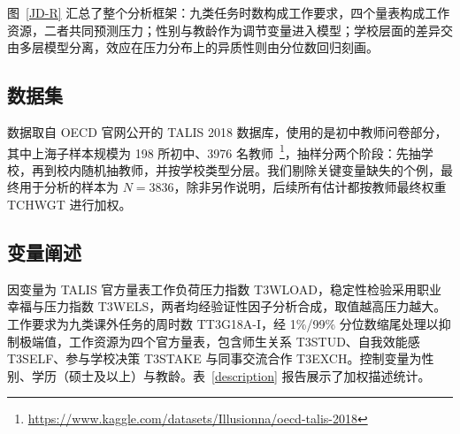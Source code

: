 \documentclass[zihao = -4, linespread = 1.5]{article}
\begin{document}
图~\ref{JD-R} 汇总了整个分析框架：九类任务时数构成工作要求，四个量表构成工作资源，二者共同预测压力；性别与教龄作为调节变量进入模型；学校层面的差异交由多层模型分离，效应在压力分布上的异质性则由分位数回归刻画。



\subsection{数据集}
数据取自 OECD 官网公开的 TALIS 2018 数据库，使用的是初中教师问卷部分，其中上海子样本规模为 198 所初中、3976 名教师~\footnote{\href{https://www.kaggle.com/datasets/illusionna/oecd-talis-2018}{https://www.kaggle.com/datasets/Illusionna/oecd-talis-2018}}，抽样分两个阶段：先抽学校，再到校内随机抽教师，并按学校类型分层。我们剔除关键变量缺失的个例，最终用于分析的样本为 $N=3836$，除非另作说明，后续所有估计都按教师最终权重 TCHWGT 进行加权。



\subsection{变量阐述}
因变量为 TALIS 官方量表工作负荷压力指数 T3WLOAD，稳定性检验采用职业幸福与压力指数 T3WELS，两者均经验证性因子分析合成，取值越高压力越大。工作要求为九类课外任务的周时数 TT3G18A-I，经 1\%/99\% 分位数缩尾处理以抑制极端值，工作资源为四个官方量表，包含师生关系 T3STUD、自我效能感 T3SELF、参与学校决策 T3STAKE 与同事交流合作 T3EXCH。控制变量为性别、学历（硕士及以上）与教龄。表~\ref{description} 报告展示了加权描述统计。
\end{document}
